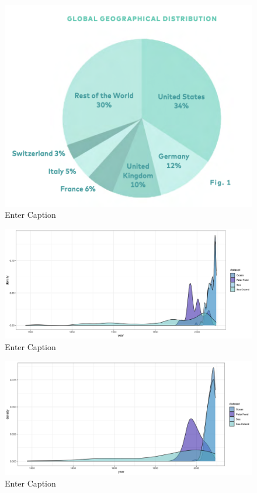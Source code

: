 \documentclass[a4paper, twoside, 12pt]{book}
\begin{document}
    \begin{figure}
        \centering
        \includegraphics[width=0.5\linewidth]{Screenshot 2023-06-15 at 11.48.15.png}
        \caption{Enter Caption}
        \label{fig:enter-label}
    \end{figure}
    \begin{figure}
    \centering
    \includegraphics[width=0.5\linewidth]{all 0.5.png}
    \caption{Enter Caption}
    \label{fig:enter-label}
\end{figure}
\begin{figure}
    \centering
    \includegraphics[width=0.5\linewidth]{all adjust 1,5.png}
    \caption{Enter Caption}
    \label{fig:enter-label}
\end{figure}
\end{document}
